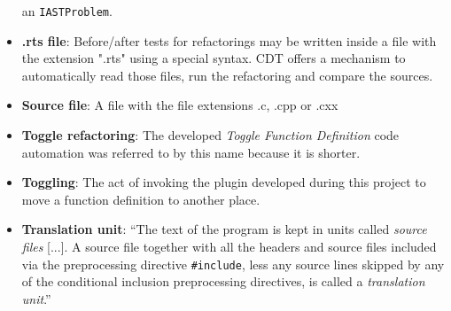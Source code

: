 \begin{itemize}
an \texttt{IASTProblem}.
\item \textbf{.rts file}: Before/after tests for refactorings may be written 
inside a file with the extension ".rts" using a special syntax. CDT offers a 
mechanism to automatically read those files, run the refactoring and compare the 
sources.
\item \textbf{Source file}: A file with the file extensions .c, .cpp or .cxx
\item \textbf{Toggle refactoring}: The developed \textit{Toggle Function 
Definition} code automation was referred to by this name because it is shorter.
\item \textbf{Toggling}: The act of invoking the plugin developed during this 
project to move a function definition to another place.
\item \textbf{Translation unit}: ``The text of the program is kept in units 
called \textit{source files} [...]. A source file together with all the headers and 
source files included via the preprocessing directive \texttt{\#include}, less 
any source lines skipped by any of the conditional inclusion preprocessing 
directives, is called a \textit{translation unit}.''\cite{IsoCpp}
\end{itemize}

